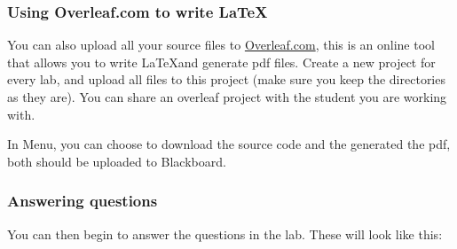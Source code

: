 \subsubsection{Using Overleaf.com to write \LaTeX}
You can also upload all your source files to \url{Overleaf.com}, this is an online tool that allows you to write \LaTeX and generate pdf files. Create a new project for every lab, and upload all files to this project (make sure you keep the directories as they are). You can share an overleaf project with the student you are working with.

In Menu, you can choose to download the source code and the generated the pdf, both should be uploaded to Blackboard.

\subsubsection{Answering questions}

You can then begin to answer the questions in the lab. These will look like this:

